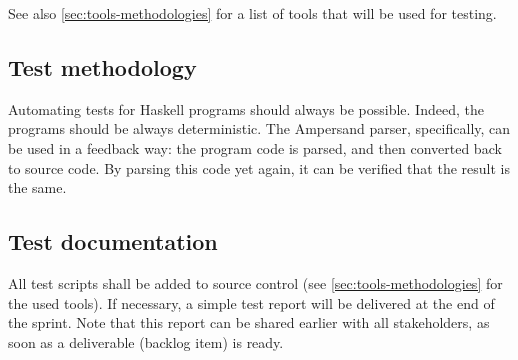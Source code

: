 See also \autoref{sec:tools-methodologies} for a list of tools that will be used for testing.

\subsection{Test methodology}
Automating tests for Haskell programs should always be possible.
Indeed, the programs should be always deterministic.
The Ampersand parser, specifically, can be used in a feedback way: the program code is parsed, and then converted back to source code.
By parsing this code yet again, it can be verified that the result is the same.

\subsection{Test documentation}
\label{subsec:test-documentation}
All test scripts shall be added to source control (see \autoref{sec:tools-methodologies} for the used tools).
If necessary, a simple test report will be delivered at the end of the sprint.
Note that this report can be shared earlier with all stakeholders, as soon as a deliverable (backlog item) is ready.
